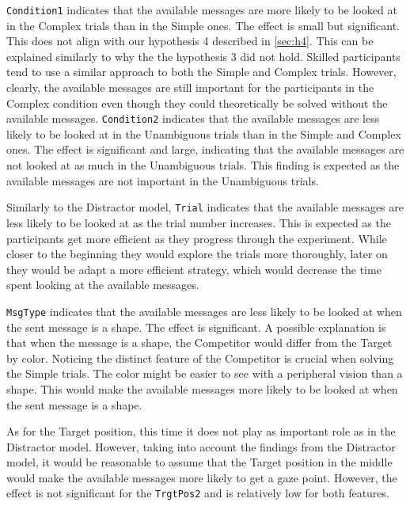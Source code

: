 \texttt{Condition1} indicates that the available messages are more likely to be looked at in the Complex trials than in the Simple ones. The effect is small but significant. This does not align with our hypothesis 4 described in \autoref{sec:h4}. This can be explained similarly to why the the hypothesis 3 did not hold. Skilled participants tend to use a similar approach to both the Simple and Complex trials. However, clearly, the available messages are still important for the participants in the Complex condition even though they could theoretically be solved without the available messages. \texttt{Condition2} indicates that the available messages are less likely to be looked at in the Unambiguous trials than in the Simple and Complex ones. The effect is significant and large, indicating that the available messages are not looked at as much in the Unambiguous trials. This finding is expected as the available messages are not important in the Unambiguous trials.

Similarly to the Distractor model, \texttt{Trial} indicates that the available messages are less likely to be looked at as the trial number increases. This is expected as the participants get more efficient as they progress through the experiment. While closer to the beginning they would explore the trials more thoroughly, later on they would be adapt a more efficient strategy, which would decrease the time spent looking at the available messages.

\texttt{MsgType} indicates that the available messages are less likely to be looked at when the sent message is a shape. The effect is significant. A possible explanation is that when the message is a shape, the Competitor would differ from the Target by color. Noticing the distinct feature of the Competitor is crucial when solving the Simple trials. The color might be easier to see with a peripheral vision than a shape. This would make the available messages more likely to be looked at when the sent message is a shape.

As for the Target position, this time it does not play as important role as in the Distractor model. However, taking into account the findings from the Distractor model, it would be reasonable to assume that the Target position in the middle would make the available messages more likely to get a gaze point. However, the effect is not significant for the \texttt{TrgtPos2} and is relatively low for both features. 

